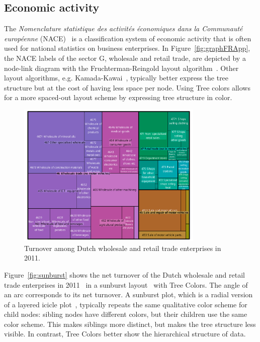 \documentclass[journal]{vgtc}                %
\begin{document}
\subsection{Economic activity}

The \textit{Nomenclature statistique des activit\'es \'economiques dans la Communaut\'e europ\'eenne} (NACE)~\cite{nace} is a classification system of economic activity that is often used for national statistics on business enterprises. In Figure~\ref{fig:graphFRApp}, the NACE labels of the sector G, wholesale and retail trade, are depicted by a node-link diagram with the Fruchterman-Reingold layout algorithm~\cite{Fruchterman91}. Other layout algorithms, e.g. Kamada-Kawai~\cite{Kamada89}, typically better express the tree structure but at the cost of having less space per node. Using Tree colors allows for a more spaced-out layout scheme by expressing tree structure in color.


\begin{figure}[!b]
  \centering
  \includegraphics[width=3.5in]{TMbusiness2.pdf}
  \caption{Turnover among Dutch wholesale and retail trade enterprises in 2011.}\label{fig:treemapApp}
\end{figure}


Figure~\ref{fig:sunburst} shows the net turnover of the Dutch wholesale and retail trade enterprises in 2011~\cite{cbsSBS} in a sunburst layout~\cite{stasko2000evaluation, stasko2000focus+} with Tree Colors. The angle of an arc corresponds to its net turnover. A sunburst plot, which is a radial version of a layered icicle plot~\cite{kruskal1983icicle,burch2010indented}, typically repeats the same qualitative color scheme for child nodes: sibling nodes have different colors, but their children use the same color scheme. This makes siblings more distinct, but makes the tree structure less visible. In contrast, Tree Colors better show the hierarchical structure of data.
\end{document}
